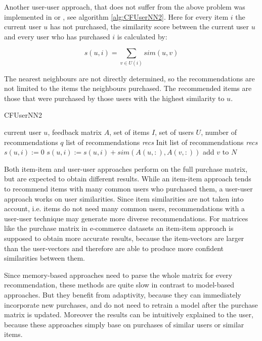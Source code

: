 \documentclass[10pt]{reportMaster}
\begin{document}
Another user-user approach, that does not suffer from the above problem was implemented in \cite{efficientTopN} or \cite{effectiveLatentModels}, see algorithm \ref{alg:CFUserNN2}.
Here for every item $i$ the current user $u$ has not purchased, the similarity score between the current user $u$ and every user who has purchased $i$ is calculated by: 

\begin{equation}
	s(u,i) = \sum_{v \in U(i)}{sim(u,v)}
\end{equation}

The nearest neighbours are not directly determined, so the recommendations are not limited to the items the neighbours purchased.
The recommended items are those that were purchased by those users with the highest similarity to $u$.

\begin{algorithm}
	\caption{CFUserNN2}
	\label{alg:CFUserNN2}
	\begin{algorithmic}[1]
		\Require current user $u$, feedback matrix $A$, set of items $I$, set of users $U$, number of recommendations $q$
		\Ensure list of recommendations \textit{recs}
		\State Init list of recommendations \textit{recs}
			\State $s(u,i) := 0$
				\State $s(u,i) := s(u,i) + sim(A(u,:), A(v,:))$
			\EndFor
				\State add $v$ to $N$
			\EndIf
		\EndFor
	\end{algorithmic}	
\end{algorithm}

Both item-item and user-user approaches perform on the full purchase matrix, but are expected to obtain different results.
While an item-item approach tends to recommend items with many common users who purchased them, a user-user approach works on user similarities.
Since item similarities are not taken into account, i.e. items do not need many common users, recommendations with a user-user technique may generate more diverse recommendations.
For matrices like the purchase matrix in e-commerce datasets an item-item approach is supposed to obtain more accurate results, because the item-vectors are larger than the user-vectors and therefore are able to produce more confident similarities between them. 

Since memory-based approaches need to parse the whole matrix for every recommendation, these methods are quite slow in contrast to model-based approaches.
But they benefit from adaptivity, because they can immediately incorporate new purchases, and do not need to retrain a model after the purchase matrix is updated.
Moreover the results can be intuitively explained to the user, because these approaches simply base on purchases of similar users or similar items.
\end{document}
